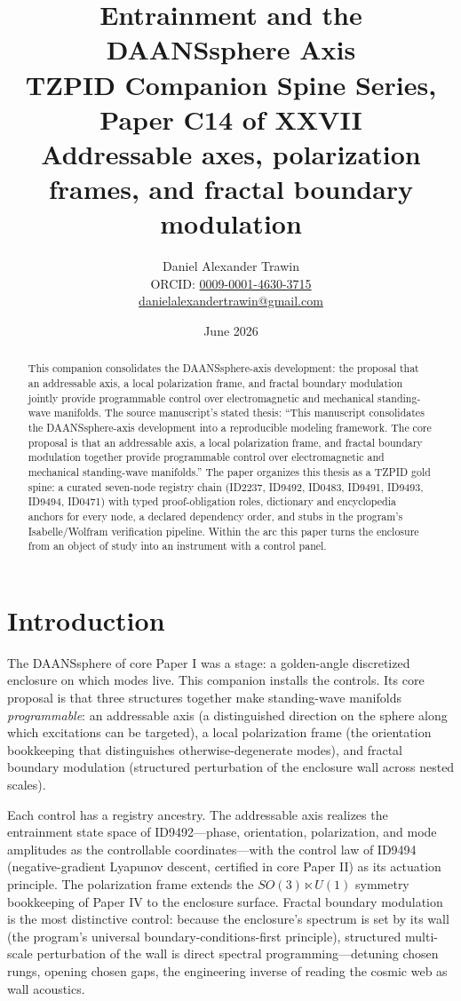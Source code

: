 \documentclass[11pt]{article}
\title{Entrainment and the DAANSsphere Axis\\[0.6em]
\large TZPID Companion Spine Series, Paper C14 of XXVII\\
\normalsize Addressable axes, polarization frames, and fractal boundary modulation}
\author{Daniel Alexander Trawin\\
\small ORCID: \href{https://orcid.org/0009-0001-4630-3715}{0009-0001-4630-3715}\\
\small \href{mailto:danielalexandertrawin@gmail.com}{danielalexandertrawin@gmail.com}}
\date{June 2026}
\theoremstyle{remark}
\begin{document}
\maketitle

\begin{abstract}
This companion consolidates the DAANSsphere-axis development: the proposal that an addressable axis, a local polarization frame, and fractal boundary modulation jointly provide programmable control over electromagnetic and mechanical standing-wave manifolds.
The source manuscript's stated thesis: ``This manuscript consolidates the DAANSsphere-axis development into a reproducible modeling framework. The core proposal is that an addressable axis, a local polarization frame, and fractal boundary modulation together provide programmable control over electromagnetic and mechanical standing-wave manifolds.'' The paper organizes this thesis as a TZPID gold spine: a curated seven-node registry chain (ID2237, ID9492, ID0483, ID9491, ID9493, ID9494, ID0471) with typed proof-obligation roles, dictionary and encyclopedia anchors for every node, a declared dependency order, and stubs in the program's Isabelle/Wolfram verification pipeline. Within the arc this paper turns the enclosure from an object of study into an instrument with a control panel.
\end{abstract}

\section{Introduction}
\label{sec:intro}

The DAANSsphere of core Paper I was a stage: a golden-angle discretized enclosure on which modes live. This companion installs the controls. Its core proposal is that three structures together make standing-wave manifolds \emph{programmable}: an addressable axis (a distinguished direction on the sphere along which excitations can be targeted), a local polarization frame (the orientation bookkeeping that distinguishes otherwise-degenerate modes), and fractal boundary modulation (structured perturbation of the enclosure wall across nested scales).

Each control has a registry ancestry. The addressable axis realizes the entrainment state space of ID9492---phase, orientation, polarization, and mode amplitudes as the controllable coordinates---with the control law of ID9494 (negative-gradient Lyapunov descent, certified in core Paper II) as its actuation principle. The polarization frame extends the $SO(3) \ltimes U(1)$ symmetry bookkeeping of Paper IV to the enclosure surface. Fractal boundary modulation is the most distinctive control: because the enclosure's spectrum is set by its wall (the program's universal boundary-conditions-first principle), structured multi-scale perturbation of the wall is direct spectral programming---detuning chosen rungs, opening chosen gaps, the engineering inverse of reading the cosmic web as wall acoustics.
\end{document}
